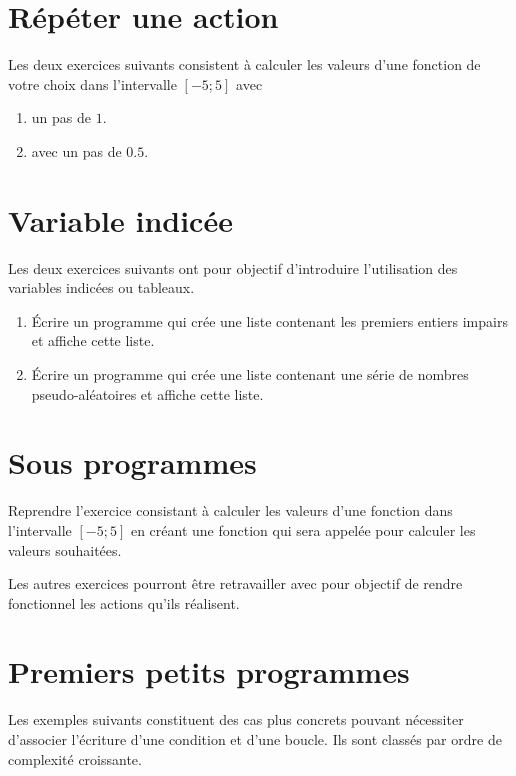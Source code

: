 \section{Répéter une action}

Les deux exercices suivants consistent à calculer les valeurs d'une fonction de votre choix dans l'intervalle $[-5;5]$ avec

\begin{enumerate}
    \item un pas de $1$.
    \item avec un pas de $0.5$.
\end{enumerate}

\section{Variable indicée}

Les deux exercices suivants ont pour objectif d'introduire l'utilisation des variables indicées ou tableaux.

\begin{enumerate}
    \item Écrire un programme qui crée une liste contenant les premiers entiers impairs et affiche cette liste.
    \item Écrire un programme qui crée une liste contenant une série de nombres pseudo-aléatoires et affiche cette liste.
\end{enumerate}

\section{Sous programmes}

Reprendre l'exercice consistant à calculer les valeurs d'une fonction dans l'intervalle $[-5;5]$ en créant une fonction qui sera appelée pour calculer les valeurs souhaitées.

Les autres exercices pourront être retravailler avec pour objectif de rendre fonctionnel les actions qu'ils réalisent.

\section{Premiers petits programmes}

Les exemples suivants constituent des cas plus concrets pouvant nécessiter d'associer l'écriture d'une condition et d'une boucle. Ils sont classés par ordre de complexité croissante.

